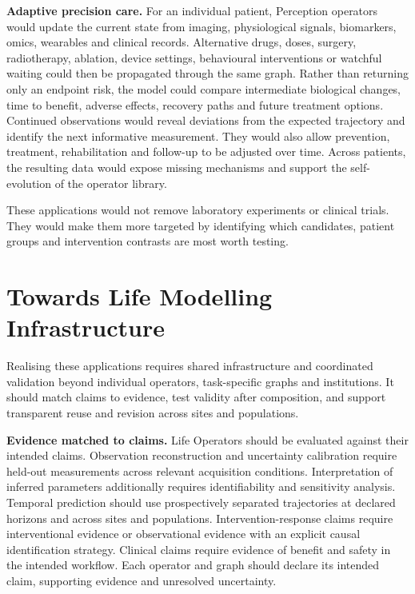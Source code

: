 \documentclass[12pt, letterpaper]{article} %
\begin{document}
\textbf{Adaptive precision care.} For an individual patient, Perception operators would update the current state from imaging, physiological signals, biomarkers, omics, wearables and clinical records. Alternative drugs, doses, surgery, radiotherapy, ablation, device settings, behavioural interventions or watchful waiting could then be propagated through the same graph. Rather than returning only an endpoint risk, the model could compare intermediate biological changes, time to benefit, adverse effects, recovery paths and future treatment options. Continued observations would reveal deviations from the expected trajectory and identify the next informative measurement. They would also allow prevention, treatment, rehabilitation and follow-up to be adjusted over time. Across patients, the resulting data would expose missing mechanisms and support the self-evolution of the operator library.

These applications would not remove laboratory experiments or clinical trials. They would make them more targeted by identifying which candidates, patient groups and intervention contrasts are most worth testing.

\section{Towards Life Modelling Infrastructure}

Realising these applications requires shared infrastructure and coordinated validation beyond individual operators, task-specific graphs and institutions. It should match claims to evidence, test validity after composition, and support transparent reuse and revision across sites and populations.

\textbf{Evidence matched to claims.} Life Operators should be evaluated against their intended claims. Observation reconstruction and uncertainty calibration require held-out measurements across relevant acquisition conditions. Interpretation of inferred parameters additionally requires identifiability and sensitivity analysis\cite{Gutenkunst2007Sloppy,Villaverde2016Identifiability}. Temporal prediction should use prospectively separated trajectories at declared horizons and across sites and populations. Intervention-response claims require interventional evidence or observational evidence with an explicit causal identification strategy\cite{HernanRobins2020Causal}. Clinical claims require evidence of benefit and safety in the intended workflow. Each operator and graph should declare its intended claim, supporting evidence and unresolved uncertainty.
\end{document}
